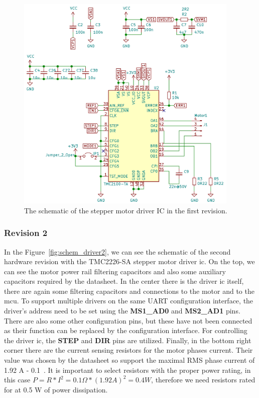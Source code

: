 \begin{figure}[H]
    \centering
    \includegraphics[width=0.95\textwidth]{obrazky/schem_driver_rev1}
    \caption{The schematic of the stepper motor driver IC in the first revision.}
    \label{fig:schem_driver1}
\end{figure}

\subsubsection{Revision 2}
In the Figure~\ref{fig:schem_driver2}, we can see the schematic of the second hardware revision with the TMC2226-SA stepper motor driver \acs{ic}.
On the top, we can see the motor power rail filtering capacitors and also some auxiliary capacitors required by the datasheet.
In the center there is the driver \acs{ic} itself, there are again some filtering capacitors and connections to the motor and to the \acs{mcu}.
To support multiple drivers on the same UART configuration interface, the driver's address need to be set using the \textbf{MS1\_AD0} and \textbf{MS2\_AD1} pins.
There are also some other configuration pins, but these have not been connected as their function can be replaced by the configuration interface.
For controlling the driver \acs{ic}, the \textbf{STEP} and \textbf{DIR} pins are utilized.
Finally, in the bottom right corner there are the current sensing resistors for the motor phases current.
Their value was chosen by the datasheet so support the maximal RMS phase current of 1.92 A - 0.1~\textohm.
It is important to select resistors with the proper power rating, in this case $P = R * I^2 = 0.1\Omega * (1.92 A)^2 = 0.4 W$, therefore we need resistors rated for at 0.5 W of power dissipation.

